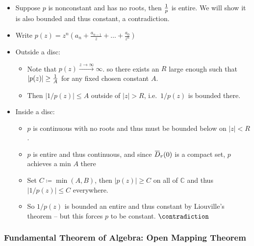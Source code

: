 \begin{itemize}
\tightlist
\item
  Suppose \(p\) is nonconstant and has no roots, then \({1\over p}\) is
  entire. We will show it is also bounded and thus constant, a
  contradiction.
\item
  Write
  \(p(z) = z^n \left(a_n + \frac{a_{n-1}}{z}+\dots+\frac{a_{0}}{z^{n}}\right)\)
\item
  Outside a disc:

  \begin{itemize}
  \tightlist
  \item
    Note that \(p(z) \overset{z\to \infty }\to \infty\). so there exists
    an \(R\) large enough such that
    \({\left\lvert {p(z)} \right\rvert} \geq {1\over A}\) for any fixed
    chosen constant \(A\).
  \item
    Then \({\left\lvert { 1/p(z)} \right\rvert} \leq A\) outside of
    \({\left\lvert {z} \right\rvert} >R\), i.e.~\(1/p(z)\) is bounded
    there.
  \end{itemize}
\item
  Inside a disc:

  \begin{itemize}
  \tightlist
  \item
    \(p\) is continuous with no roots and thus must be bounded below on
    \({\left\lvert {z} \right\rvert} < R\).
  \item
    \(p\) is entire and thus continuous, and since
    \(\mkern 1.5mu\overline{\mkern-1.5muD\mkern-1.5mu}\mkern 1.5mu_r(0)\)
    is a compact set, \(p\) achieves a min \(A\) there
  \item
    Set \(C \coloneqq\min(A, B)\), then
    \({\left\lvert {p(z)} \right\rvert} \geq C\) on all of
    \({\mathbb{C}}\) and thus
    \({\left\lvert {1/p(z)} \right\rvert} \leq C\) everywhere.
  \item
    So \(1/p(z)\) is bounded an entire and thus constant by Liouville's
    theorem -- but this forces \(p\) to be constant. \(\contradiction\)
  \end{itemize}
\end{itemize}

\hypertarget{fundamental-theorem-of-algebra-open-mapping-theorem}{%
\subsubsection{Fundamental Theorem of Algebra: Open Mapping
Theorem}\label{fundamental-theorem-of-algebra-open-mapping-theorem}}

